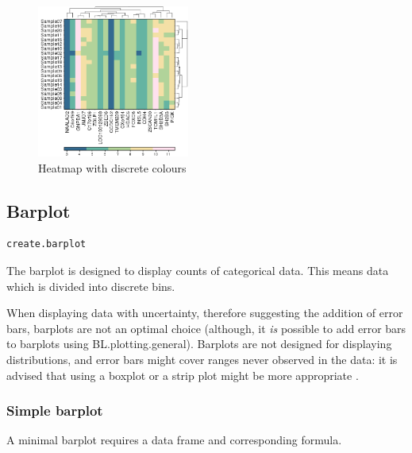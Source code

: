 \documentclass[letterpaper]{article}
\begin{document}
\begin{figure}[!ht]
  \begin{center}
     \includegraphics[width=50mm]{Figures/Heatmap_Discrete.png}
     \caption{Heatmap with discrete colours}
  \end{center}
\end{figure}

\subsection{Barplot}
\begin{verbatim}
create.barplot
\end{verbatim}

The barplot is designed to display counts of categorical data. This means data which is divided into discrete bins. 

When displaying data with uncertainty, therefore suggesting the addition of error bars, barplots are not an optimal choice (although, it \textit{is} possible to add error bars to barplots using BL.plotting.general). Barplots are not designed for displaying distributions, and error bars might cover ranges never observed in the data: it is advised that using a boxplot  or a strip plot might be more appropriate \cite{streit}. 

\subsubsection{Simple barplot}
A minimal barplot requires a data frame and corresponding formula.
\end{document}
